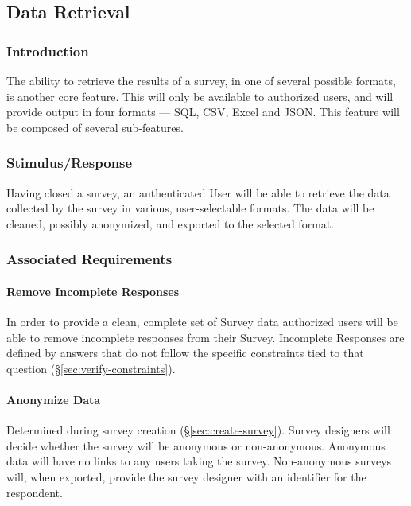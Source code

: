 \documentclass[10pt,letter]{report}
\def\hl#1{#1}
\begin{document}
\subsection{Data Retrieval}
\label{sec:data-retrieval}

\subsubsection{Introduction}
\label{sec:introduction-retrieval}

The ability to retrieve the results of a survey, in one of several
possible formats, is another core feature.  This will only be
available to authorized users, and will provide output in four formats
--- \hl{SQL}, \hl{CSV}, \hl{Excel} and \hl{JSON}.  This feature will be composed of several
sub-features.


\subsubsection{Stimulus/Response}
\label{sec:stim-resp-retrieval}

Having closed a survey, an authenticated User will be able to retrieve
the data collected by the survey in various, user-selectable formats.
The data will be cleaned, possibly anonymized, and exported to the
selected format.

\subsubsection{Associated Requirements}
\label{sec:assoc-reqs-retrieval}

\paragraph{Remove Incomplete Responses}
\label{sec:remove-responses}

In order to provide a clean, complete set of Survey data authorized
users will be able to remove incomplete responses from their
Survey. Incomplete Responses are defined by answers that do not follow
the specific constraints tied to that question
(\S\ref{sec:verify-constraints}).

\paragraph{Anonymize Data}
\label{sec:anonymize-data}

Determined during survey creation (\S\ref{sec:create-survey}). Survey
designers will decide whether the survey will be anonymous or
non-anonymous. Anonymous data will have no links to any users taking
the survey. Non-anonymous surveys will, when exported, provide the
survey designer with an identifier for the respondent.
\end{document}
